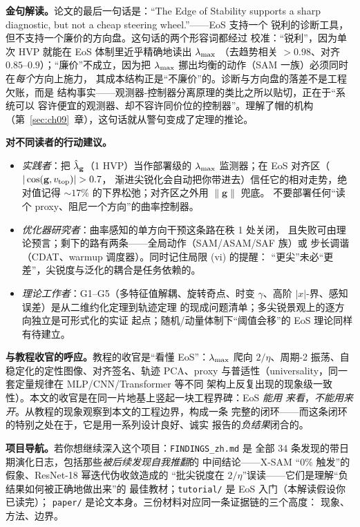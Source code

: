 \textbf{金句解读。}论文的最后一句话是：“The Edge of Stability supports
a sharp diagnostic, but not a cheap steering wheel.”——EoS 支持一个
锐利的诊断工具，但不支持一个廉价的方向盘。这句话的两个形容词都经过
校准：“锐利”，因为单次 HVP 就能在 EoS 体制里近乎精确地读出 $\lambda_{\max}$
（去趋势相关 $>0.98$、对齐 $0.85$--$0.9$）；“廉价”不成立，因为把
$\lambda_{\max}$ 挪出均衡的动作（SAM 一族）必须同时在\emph{每个}方向上施力，
其成本结构正是“不廉价”的。诊断与方向盘的落差不是工程欠账，而是
结构事实——观测器-控制器分离原理的类比之所以贴切，正在于“系统可以
容许便宜的观测器、却不容许同价位的控制器”。理解了帽的机构
（第~\ref{sec:ch09}~章），这句话就从警句变成了定理的推论。

\textbf{对不同读者的行动建议。}
\begin{itemize}
  \item \emph{实践者}：把 $\hat{\lambda}_{\mathbf{g}}$（1 HVP）当作部署级的 $\lambda_{\max}$
        监测器；在 EoS 对齐区（$|\cos(\mathbf{g},\vtope)|>0.7$，
        渐进尖锐化会自动把你带进去）信任它的相对走势，绝对值记得
        ${\sim}17\%$ 的下界松弛；对齐区之外用 $\|\mathbf{g}\|$ 兜底。
        不要部署任何“读个 proxy、阻尼一个方向”的曲率控制器。
  \item \emph{优化器研究者}：曲率感知的单方向干预这条路在秩 1 处关闭，
        且失败可由理论预言；剩下的路有两条——全局动作（SAM/ASAM/SAF 族）或
        步长调谐（CDAT、warmup 调度器）。同时记住局限 (vi) 的提醒：
        “更尖”未必“更差”，尖锐度与泛化的耦合是任务依赖的。
  \item \emph{理论工作者}：G1--G5（多特征值解耦、旋转奇点、时变
        $\gamma$、高阶 $|x|$-界、感知误差）是从二维约化定理到轨迹定理
        的现成问题清单；多尖锐景观上的逐方向独立是可形式化的实证
        起点；随机/动量体制下“阈值会移”的 EoS 理论同样有待建立。
\end{itemize}

\textbf{与教程收官的呼应。}教程的收官是“看懂 EoS”：$\lambda_{\max}$ 爬向
$2/\eta$、周期-2 振荡、自稳定化的定性图像、对齐签名、轨迹 PCA、proxy
与普适性（universality，同一套定量规律在 MLP/CNN/Transformer 等不同
架构上反复出现的现象级一致性）。本文的收官是在同一片地基上竖起一块工程界碑：EoS \emph{能用
来看}，\emph{不能用来开}。从教程的现象观察到本文的工程边界，构成一条
完整的闭环——而这条闭环的特别之处在于，它是用一系列设计良好、诚实
报告的\emph{负结果}闭合的。

\textbf{项目导航。}若你想继续深入这个项目：\texttt{FINDINGS\_zh.md} 是
全部 34 条发现的带日期演化日志，包括那些\emph{被后续发现自我推翻}的
中间结论——X-SAM “0\% 触发”的假象、ResNet-18 幂迭代伪收敛造成的
“批尖锐度在 $2/\eta$”误读——它们是理解“负结果如何被正确地做出来”的
最佳教材；\texttt{tutorial/} 是 EoS 入门（本解读假设你已读完）；
\texttt{paper/} 是论文本身。三份材料对应同一条证据链的三个高度：
现象、方法、边界。
